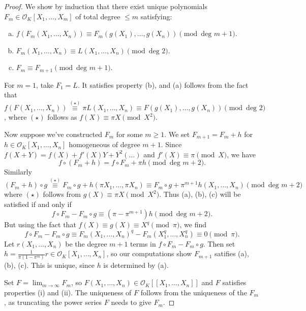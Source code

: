 \documentclass{article}
\theoremstyle{definition}
\begin{document}
\begin{proof}
    We show by induction that there exist unique polynomials $F_m \in \mathcal{O}_K[X_1,\ldots,X_m]$ of total degree $\le m$ satisfying:
    \begin{enumerate}[(a)]
        \item $f(F_m(X_1,\ldots,X_n)) \equiv F_m(g(X_1),\ldots,g(X_n)) \pmod{\text{deg }m+1}$.
        \item $F_m(X_1,\ldots,X_n) \equiv L(X_1,\ldots,X_n) \pmod{\text{deg }2}$.
        \item $F_m \equiv F_{m+1} \pmod{\text{deg }m+1}$.
    \end{enumerate}
    For $m=1$, take $F_1=L$. It satisfies property (b), and (a) follows from the fact that $f(F(X_1,\ldots,X_n)) \stackrel{(\star)}{\equiv } \pi L(X_1,\ldots,X_n)\equiv F(g(X_1),\ldots,g(X_n)) \pmod{\text{deg }2}$, where $(\star)$ follows as $f(X) \equiv \pi X \pmod{X^2}$. 
    \vspace{1mm}
     
    Now suppose we've constructed $F_m$ for some $m\ge 1$. We set $F_{m+1} = F_m + h$ for $h \in \mathcal{O}_K[X_1,\ldots,X_n]$ homogeneous of degree $m+1$. Since $f(X+Y) = f(X) + f'(X)Y + Y^2(\ldots)$ and $f'(X) \equiv \pi \pmod{X}$, we have $$f \circ (F_m + h) = f \circ F_m + \pi h \pmod{\text{deg }m+2}.$$ Similarly $(F_m + h) \circ g \stackrel{(\star)}{\equiv}  F_m \circ g + h(\pi X_1,\ldots,\pi X_n) \equiv F_m \circ g + \pi^{m+1}h(X_1,\ldots,X_n) \pmod{\text{deg }m+2}$ where $(\star)$ follows from $g(X) \equiv \pi X \pmod{X^2}$. Thus (a), (b), (c) will be satisfied if and only if $$f \circ F_m - F_m \circ g \equiv (\pi - \pi^{m+1})h \pmod{\text{deg }m+2}.$$ But using the fact that $f(X) \equiv g(X) \equiv X^q \pmod{\pi}$, we find $$f \circ F_m - F_m \circ g \equiv F_m(X_1,\ldots,X_n)^q - F_m(X_1^q,\ldots,X_n^q) \equiv 0 \pmod{\pi}.$$
    Let $r(X_1,\ldots,X_n)$ be the degree $m+1$ terms in $f \circ F_m - F_m \circ g$. Then set $h =\frac{1}{\pi(1-\pi^m)}r \in \mathcal{O}_K[X_1,\ldots,X_n]$, so our computations show $F_{m+1}$ satifies (a), (b), (c). This is unique, since $h$ is determined by (a).
    \vspace{1mm}
     
    Set $F = \lim_{m \to \infty}F_m$, so $F(X_1,\ldots,X_n) \in \mathcal{O}_K[[X_1,\ldots,X_n]]$ and $F$ satisfies properties (i) and (ii). The uniqueness of $F$ follows from the uniqueness of the $F_m$, as truncating the power series $F$ needs to give $F_m$.
\end{proof}
\end{document}
